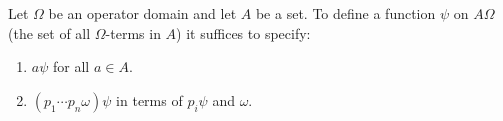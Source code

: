 Let $\Omega$ be an operator domain and let $A$ be a set. To define a function $\psi$ on $A\Omega$ (the set of all $\Omega$-terms in $A$) it suffices to specify:

\begin{enumerate}
\item[(1.15)] $a\psi$ for all $a \in A$.
\item[(1.16)] $(p_1 \cdots p_n \omega)\psi$ in terms of $p_i\psi$ and $\omega$.
\end{enumerate}
